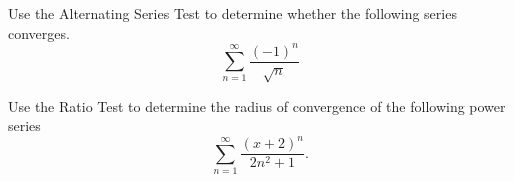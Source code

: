 \documentclass[11pt]{exam}
\begin{document}
\begin{questions}

\newpage
\addpoints 
\question[1] Use the Alternating Series Test to determine whether the following series converges. 
\begin{equation*}
\sum_{n=1}^{\infty} \frac{(-1)^n}{\sqrt{n}}
\end{equation*}


\newpage
\addpoints
\question[2] Use the Ratio Test to determine the radius of convergence of the following power series
\begin{equation*}
\sum_{n=1}^{\infty} \frac{(x+2)^n}{2n^2+1}.
\end{equation*}

\end{questions}
\end{document}
